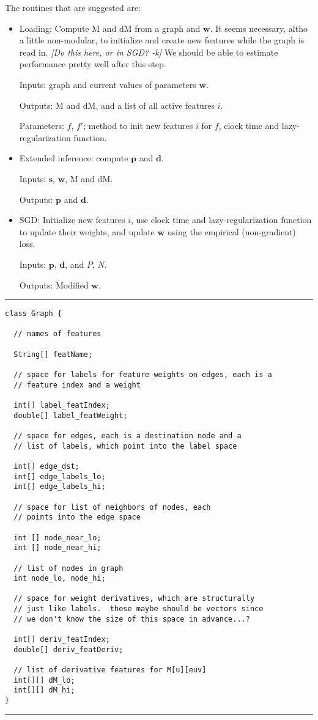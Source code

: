 \documentclass[12pt]{article}
\newcommand{\vek}[1]{\textbf{#1}}
\newcommand{\M}{\textrm{M}}
\newcommand{\dM}{\textrm{dM}}
\begin{document}
\noindent
The routines that are suggested are:
\begin{itemize}
\item Loading: Compute $\M$ and $\dM$ from a graph and $\vek{w}$.  It
  seems necessary, altho a little non-modular, to initialize and
  create new features while the graph is read in. \emph{ [Do this here, or in SGD? -k]} We should be able
  to estimate performance pretty well after this step.

Inputs: graph and current values of parameters $\vek{w}$.

Outputs: $\M$ and $\dM$, and a list of all active features $i$.

Parameters: $f$, $f'$; method to init new features $i$ for $f$, clock
time and lazy-regularization function.
 
\item Extended inference: compute $\vek{p}$ and $\vek{d}$.
 
Inputs: $\vek{s}$, $\vek{w}$, $\M$ and $\dM$.

Outputs: $\vek{p}$ and $\vek{d}$.

\item SGD: Initialize new features $i$, use clock time and
  lazy-regularization function to update their weights, and update
  $\vek{w}$ using the empirical (non-gradient) loss.

Inputs: $\vek{p}$, $\vek{d}$, and $P$, $N$.

Outputs: Modified $\vek{w}$.

\end{itemize}

\begin{table}
\hrule
\begin{verbatim}
class Graph {

  // names of features

  String[] featName;

  // space for labels for feature weights on edges, each is a
  // feature index and a weight

  int[] label_featIndex;
  double[] label_featWeight;

  // space for edges, each is a destination node and a
  // list of labels, which point into the label space

  int[] edge_dst;
  int[] edge_labels_lo;
  int[] edge_labels_hi;

  // space for list of neighbors of nodes, each 
  // points into the edge space

  int [] node_near_lo;
  int [] node_near_hi;

  // list of nodes in graph
  int node_lo, node_hi;

  // space for weight derivatives, which are structurally 
  // just like labels.  these maybe should be vectors since 
  // we don't know the size of this space in advance...?

  int[] deriv_featIndex;
  double[] deriv_featDeriv;

  // list of derivative features for M[u][euv]
  int[][] dM_lo;
  int[][] dM_hi;
}
\end{verbatim}
\caption{Proposed data structure for graph} \label{alg:data}
\hrule
\end{table}
\end{document}
